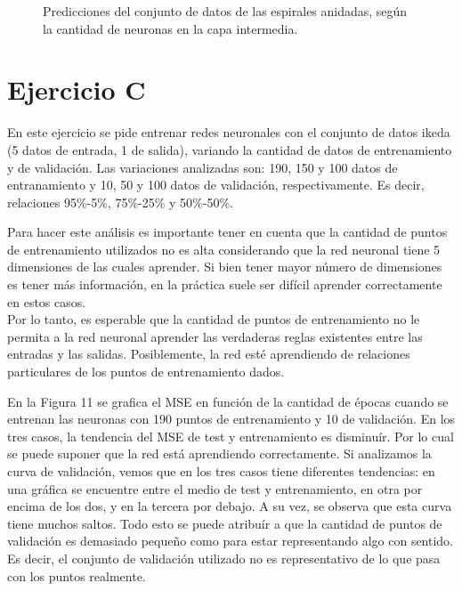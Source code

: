 \documentclass[12pt, a4paper]{article}
\begin{document}
\begin{figure}
    \caption{Predicciones del conjunto de datos de las espirales anidadas, según la cantidad de neuronas en la capa intermedia.}
\end{figure}

\newpage

\section*{Ejercicio C}

En este ejercicio se pide entrenar redes neuronales con el conjunto de datos ikeda (5 datos de entrada, 1 de salida), variando la cantidad de datos de entrenamiento y de validación. Las variaciones analizadas son: 190, 150 y 100 datos de entranamiento y 10, 50 y 100 datos de validación, respectivamente. Es decir, relaciones 95\%-5\%, 75\%-25\% y 50\%-50\%.

\bigskip

Para hacer este análisis es importante tener en cuenta que la cantidad de puntos de entrenamiento utilizados no es alta considerando que la red neuronal tiene 5 dimensiones de las cuales aprender. Si bien tener mayor número de dimensiones es tener más información, en la práctica suele ser difícil aprender correctamente en estos casos. \\
Por lo tanto, es esperable que la cantidad de puntos de entrenamiento no le permita a la red neuronal aprender las verdaderas reglas existentes entre las entradas y las salidas. Posiblemente, la red esté aprendiendo de relaciones particulares de los puntos de entrenamiento dados.
 
 \bigskip
 
En la Figura 11 se grafica el MSE en función de la cantidad de épocas cuando se entrenan las neuronas con 190 puntos de entrenamiento y 10 de validación. En los tres casos, la tendencia del MSE de test y entrenamiento es disminuír. Por lo cual se puede suponer que la red está aprendiendo correctamente. Si analizamos la curva de validación, vemos que en los tres casos tiene diferentes tendencias: en una gráfica se encuentre entre el medio de test y entrenamiento, en otra por encima de los dos, y en la tercera por debajo. A su vez, se observa que esta curva tiene muchos saltos. Todo esto se puede atribuír a que la cantidad de puntos de validación es demasiado pequeño como para estar representando algo con sentido. Es decir, el conjunto de validación utilizado no es representativo de lo que pasa con los puntos realmente.
 
\end{document}

